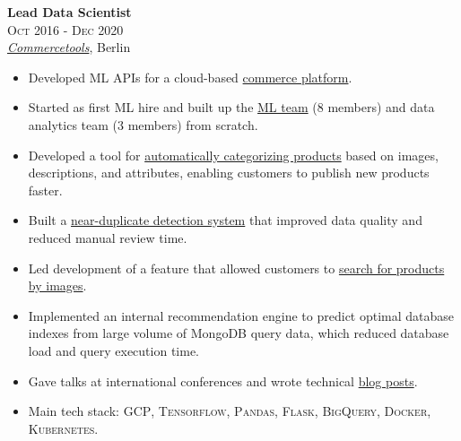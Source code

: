 \documentclass[a4paper,9.5pt]{article}
\begin{document}
\begin{minipage}[t]{0.65\textwidth}
\textbf{Lead Data Scientist}\\
\textsc{Oct 2016 - Dec 2020}\\
\emph{\href{https://commercetools.com/}{Commercetools}}, Berlin
\vspace{1mm}
\begin{itemize}[leftmargin=1em, itemsep=1mm, parsep=0.5mm]
  \item Developed ML APIs for a cloud-based \href{https://docs.commercetools.com}{commerce platform}.
  \item Started as first ML hire and built up the \href{https://techblog.commercetools.com/building-up-a-data-science-team-from-scratch-7a7b24ba9f2d}{ML team} (8 members) and data analytics team (3 members) from scratch.
  \item Developed a tool for \href{https://techblog.commercetools.com/boosting-product-categorization-with-machine-learning-ad4dbd30b0e8}{automatically categorizing products} based on images, descriptions, and attributes, enabling customers to publish new products faster.
  \item Built a \href{https://medium.com/@Evi.lazaridou/improving-data-quality-with-product-similarity-search-d037c7212071}{near-duplicate detection system} that improved data quality and reduced manual review time.
  \item Led development of a feature that allowed customers to \href{https://medium.com/@mnalavadi/reverse-image-search-with-machine-learning-92786a07c142}{search for products by images}.
  \item Implemented an internal recommendation engine to predict optimal database indexes from large volume of MongoDB query data, which reduced database load and query execution time.
  \item Gave talks at international conferences and wrote technical \href{https://medium.com/@amadeus.magrabi}{blog posts}.
  \item Main tech stack: \textsc{GCP}, \textsc{Tensorflow}, \textsc{Pandas}, \textsc{Flask}, \textsc{BigQuery}, \textsc{Docker}, \textsc{Kubernetes}.
\end{itemize}
\vspace{2mm}


\end{minipage}
\end{document}
